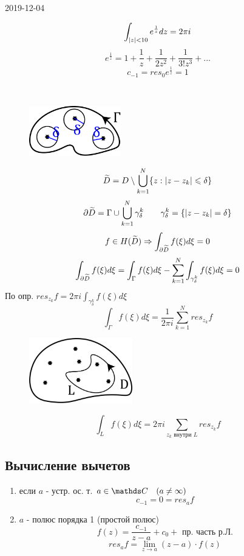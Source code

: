 \documentclass[main]{subfiles}
\begin{document}
\begin{lect}{2019-12-04}
    \begin{Example}
        \[\int_{\left|z\right| < 10}  e^{\frac{1}{z}}dz = 2\pi i\]
        \[e^{\frac{1}{z}}  = 1 + \frac{1}{z}  + \frac{1}{2z^2} + \frac{1}{3!z^3} + ...\]
        \[c_{-1} = res_0e^{\frac{1}{z}}  = 1 \]
    \end{Example}

    \begin{Proof}\
        \begin{figure}[H]
            \includegraphics[width=4cm]{pics/13_5}
            \centering
        \end{figure}
        \[\widetilde{D} = D \setminus \bigcup_{k = 1}^N  \{z : \left|z - z_k\right| \leqslant \delta\}\]
        \[\partial \widetilde{D} = \Gamma \cup \bigcup_{k = 1}^N \gamma_\delta^k \qquad
        \gamma_\delta^k = \{\left|z - z_k\right| = \delta\}\]
        \[f \in H(\widetilde{D}) \Rightarrow \int_{\partial \widetilde{D}} f(\xi)d\xi = 0 \]
        \[\int_{\partial \widetilde{D}} f(\xi)d\xi = \int_{\Gamma} f(\xi)d\xi -
        \sum_{k = 1}^N \int_{\gamma_\delta^k} f(\xi)d\xi = 0  \]
        По опр. $res_{z_k} f = 2\pi i \int_{\gamma_\delta^k} f(\xi)d\xi  $
        \[\int_\Gamma f(\xi) d\xi = \frac{1}{2\pi i} \sum_{k = 1}^N res_{z_k} f  \]
        \begin{figure}[H]
            \includegraphics[width=4.5cm]{pics/13_6}
            \centering
        \end{figure}
        \[\int_{L} f(\xi)d\xi = 2\pi i \sum_{z_k \text{ внутри } L}  res_{z_k} f  \]
    \end{Proof}

    \subsection{Вычисление вычетов}

    \begin{definition}
        \begin{enumerate}
            \item если $a$ - устр. ос. т. \q $a \in \CC \q (a \neq \infty)$
                \[c_{-1} = 0 = res_a f \]
            \item $a$ - полюс порядка 1 (простой полюс)
                \[f(z) = \frac{c_{-1} }{z - a} + c_0 + \text{ пр. часть р.Л.}\]
                \[res_a f = \lim_{z \to a} (z - a) \cdot f(z) \]
        \end{enumerate}
    \end{definition}


\end{lect}
\end{document}

